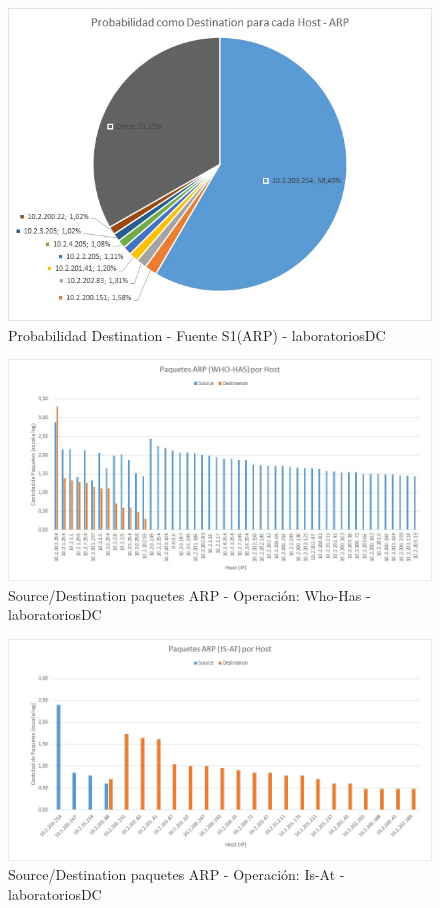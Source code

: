 \begin{figure}[h!]
\centering
\includegraphics[scale=0.6]{./img/proba_dst_laboDC.jpg}
\caption{Probabilidad Destination - Fuente S1(ARP) - laboratoriosDC}
\end{figure}
\newpage



\begin{figure}[h!]
\centering
\includegraphics[scale=0.7]{./img/arp_whoHas_laboDC.jpg}
\caption{Source/Destination paquetes ARP - Operación: Who-Has - laboratoriosDC}
\end{figure}

\begin{figure}[h!]
\centering
\includegraphics[scale=0.7]{./img/arp_isAt_laboDC.jpg}
\caption{Source/Destination paquetes ARP - Operación: Is-At - laboratoriosDC}
\end{figure}
\newpage

